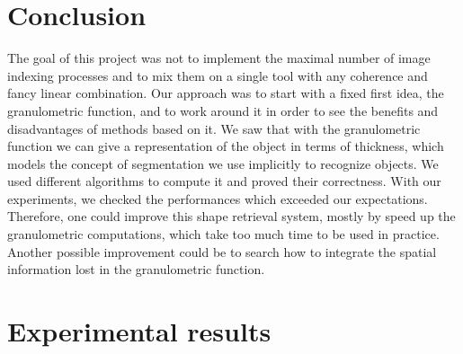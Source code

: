 \section*{Conclusion}

The goal of this project was not to implement the maximal number of image indexing processes and to mix them on a single tool with any coherence and fancy linear combination. Our approach was to start with a fixed first idea, the granulometric function, and to work around it in order to see the benefits and disadvantages of methods based on it. We saw that with the granulometric function we can give a representation of the object in terms of thickness, which models the concept of segmentation we use implicitly to recognize objects. We used different algorithms to compute it and proved their correctness. With our experiments, we checked the performances which exceeded our expectations. Therefore, one could improve this shape retrieval system, mostly by speed up the granulometric computations, which take too much time to be used in practice. Another possible improvement could be to search how to integrate the spatial information lost in the granulometric function.




\newpage

\appendix

\section{Experimental results}

